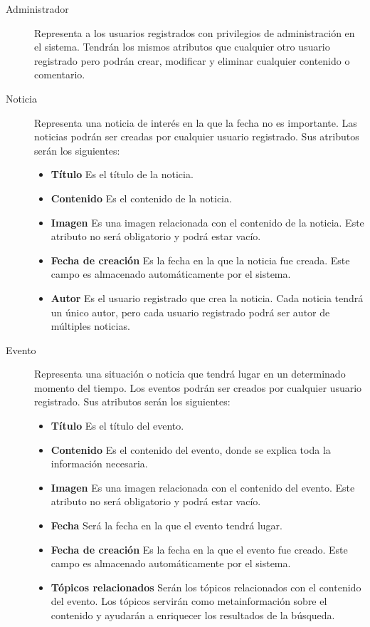 \begin{description}
\item[Administrador]  Representa a los usuarios registrados con privilegios de administración en el sistema.  Tendrán los mismos atributos que cualquier otro usuario registrado pero podrán crear, modificar y eliminar cualquier contenido o comentario.
\item[Noticia]  Representa una noticia de interés en la que la fecha no es importante.  Las noticias podrán ser creadas por cualquier usuario registrado.  Sus atributos serán los siguientes:
							\begin{itemize}
							\item \textbf{Título}  Es el título de la noticia.
							\item \textbf{Contenido}  Es el contenido de la noticia.
							\item \textbf{Imagen}  Es una imagen relacionada con el contenido de la noticia.  Este atributo no será obligatorio y podrá estar vacío.
							\item \textbf{Fecha de creación}  Es la fecha en la que la noticia fue creada.  Este campo es almacenado automáticamente por el sistema.
							\item \textbf{Autor}  Es el usuario registrado que crea la noticia.  Cada noticia tendrá un único autor, pero cada usuario registrado podrá ser autor de múltiples noticias.
							\end{itemize}
\item[Evento]  Representa una situación o noticia que tendrá lugar en un determinado momento del tiempo.  Los eventos podrán ser creados por cualquier usuario registrado.  Sus atributos serán los siguientes:
							\begin{itemize}
							\item \textbf{Título}  Es el título del evento.
							\item \textbf{Contenido}  Es el contenido del evento, donde se explica toda la información necesaria.
							\item \textbf{Imagen}  Es una imagen relacionada con el contenido del evento.  Este atributo no será obligatorio y podrá estar vacío.
							\item \textbf{Fecha}  Será la fecha en la que el evento tendrá lugar.
							\item \textbf{Fecha de creación}  Es la fecha en la que el evento fue creado.  Este campo es almacenado automáticamente por el sistema.
							\item \textbf{Tópicos relacionados}  Serán los tópicos relacionados con el contenido del evento.  Los tópicos servirán como metainformación sobre el contenido y ayudarán a enriquecer los resultados de la búsqueda.

\end{itemize}
\end{description}
